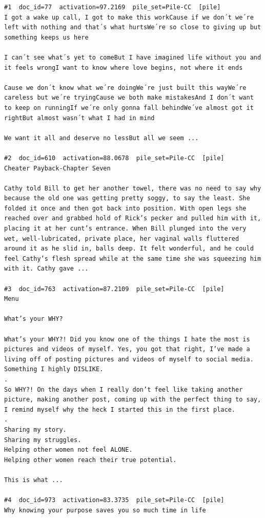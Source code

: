 \begin{verbatim}
#1  doc_id=77  activation=97.2169  pile_set=Pile-CC  [pile]
I got a wake up call, I got to make this workCause if we don´t we´re left with nothing and that´s what hurtsWe´re so close to giving up but something keeps us here

I can´t see what´s yet to comeBut I have imagined life without you and it feels wrongI want to know where love begins, not where it ends

Cause we don´t know what we´re doingWe´re just built this wayWe´re careless but we´re tryingCause we both make mistakesAnd I don´t want to keep on runningIf we´re only gonna fall behindWe´ve almost got it rightBut almost wasn´t what I had in mind

We want it all and deserve no lessBut all we seem ...

#2  doc_id=610  activation=88.0678  pile_set=Pile-CC  [pile]
Cheater Payback-Chapter Seven

Cathy told Bill to get her another towel, there was no need to say why because the old one was getting pretty soggy, to say the least. She folded it once and then got back into position. With open legs she reached over and grabbed hold of Rick’s pecker and pulled him with it, placing it at her cunt’s entrance. When Bill plunged into the very wet, well-lubricated, private place, her vaginal walls fluttered around it as he slid in, balls deep. It felt wonderful, and he could feel Cathy’s flesh spread while at the same time she was squeezing him with it. Cathy gave ...

#3  doc_id=763  activation=87.2109  pile_set=Pile-CC  [pile]
Menu

What’s your WHY?

What’s your WHY?! Did you know one of the things I hate the most is pictures and videos of myself. Yes, you got that right, I’ve made a living off of posting pictures and videos of myself to social media. Something I highly DISLIKE.
.
So WHY?! On the days when I really don’t feel like taking another picture, making another post, coming up with the perfect thing to say, I remind myself why the heck I started this in the first place.
.
Sharing my story.
Sharing my struggles.
Helping other women not feel ALONE.
Helping other women reach their true potential.

This is what ...

#4  doc_id=973  activation=83.3735  pile_set=Pile-CC  [pile]
Why knowing your purpose saves you so much time in life


\end{verbatim}
